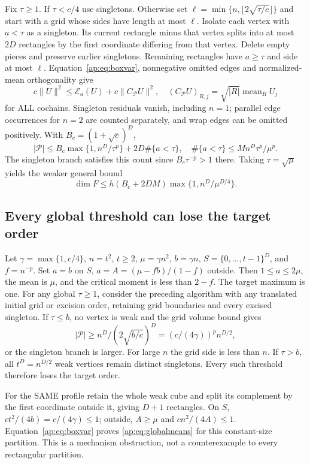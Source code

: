 \documentclass[11pt]{article}
\newcommand{\E}{\mathcal E}
\begin{document}
Fix $\tau\geq1$. If $\tau<c/4$ use singletons. Otherwise set
$\ell=\min\{n,\lfloor2\sqrt{\tau/c}\rfloor\}$ and start with a grid
whose sides have length at most $\ell$. Isolate each vertex with $a<\tau$
as a singleton. Its current rectangle minus that vertex splits into at most
$2D$ rectangles by the first coordinate differing from that vertex. Delete
empty pieces and preserve earlier singletons. Remaining rectangles have
$a\geq\tau$ and side at most $\ell$. Equation~\eqref{ap:eq:boxvar},
nonnegative omitted edges and normalized-mean orthogonality give
\begin{equation}\label{ap:eq:globalmeans}
 c\|U\|^2\leq\E_a(U)+c\|C_{\mathcal P}U\|^2,
 \quad (C_{\mathcal P}U)_{R,j}=\sqrt{|R|}\operatorname{mean}_R U_j
\end{equation}
for ALL cochains. Singleton residuals vanish, including $n=1$; parallel
edge occurrences for $n=2$ are counted separately, and wrap edges can be
omitted positively. With $B_c=(1+\sqrt c)^D$,
\[
 |\mathcal P|\leq B_c\max\{1,n^D/\tau^p\}+2D\#\{a<\tau\},\quad
 \#\{a<\tau\}\leq M n^D\tau^p/\mu^p.
\]
The singleton branch satisfies this count since $B_c\tau^{-p}>1$ there.
Taking $\tau=\sqrt \mu$ yields the weaker general bound
\[
 \dim F\leq h(B_c+2DM)\max\{1,n^D/\mu^{D/4}\}.
\]

\subsection{Every global threshold can lose the target order}
Let $\gamma=\max\{1,c/4\}$, $n=t^2$, $t\geq2$, $\mu=\gamma n^2$,
$b=\gamma n$, $S=\{0,\ldots,t-1\}^D$, and $f=n^{-p}$. Set $a=b$ on
$S$, $a=A=(\mu-fb)/(1-f)$ outside. Then $1\leq a\leq2\mu$, the mean is
$\mu$, and the critical moment is less than $2-f$. The target maximum is one.
For any global $\tau\geq1$, consider the preceding algorithm with any
translated initial grid or excision order, retaining grid boundaries and
every excised singleton. If $\tau\leq b$, no vertex is weak and the grid
volume bound gives
\[
 |\mathcal P|\geq n^D/(2\sqrt{b/c})^D
     =(c/(4\gamma))^p n^{D/2},
\]
or the singleton branch is larger. For large $n$ the grid side is less
than $n$. If $\tau>b$, all $t^D=n^{D/2}$ weak vertices remain distinct
singletons. Every such threshold therefore loses the target order.

For the SAME profile retain the whole weak cube and split its complement
by the first coordinate outside it, giving $D+1$ rectangles. On $S$,
$ct^2/(4b)=c/(4\gamma)\leq1$; outside, $A\geq \mu$ and
$cn^2/(4A)\leq1$. Equation~\eqref{ap:eq:boxvar} proves
\eqref{ap:eq:globalmeans} for this constant-size partition. This is a
mechanism obstruction, not a counterexample to every rectangular partition.
\end{document}
